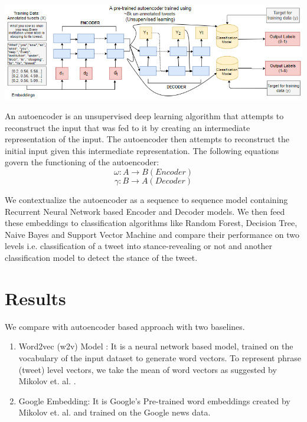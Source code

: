 \documentclass[a0,portrait]{a0poster}
\begin{document}
\begin{multicols}{2}
\begin{center}\vspace{1cm}
\includegraphics[width=0.8\linewidth]{autoencoder.png}
\end{center}\vspace{1cm}

An autoencoder is an unsupervised deep learning algorithm that attempts to reconstruct the input that was fed to it by creating an intermediate representation of the input. The autoencoder then attempts to reconstruct the initial input given this intermediate representation. The following equations govern the functioning of the autoencoder:
\begin{equation}
     \omega: A \to B (Encoder)
 \end{equation}
 \begin{equation}
     \gamma: B \to A (Decoder)
 \end{equation}

We contextualize the autoencoder as a sequence to sequence model containing Recurrent Neural Network based Encoder and Decoder models. We then feed these embeddings to classification algorithms like Random Forest, Decision Tree, Naive Bayes and Support Vector Machine and compare their performance on two levels i.e. classification of a tweet into stance-revealing or not and another classification model to detect the stance of the tweet.

\section*{Results}

We compare with autoencoder based approach with two baselines.
\begin{enumerate}
    \item Word2vec (w2v) Model \cite{mikolov2013efficient}: It is a neural network based model, trained on the vocabulary of the input dataset to generate word vectors. To represent phrase (tweet) level vectors, we take the mean of word vectors as suggested by Mikolov et. al. \cite{mikolov2013distributed}. 
    \item Google Embedding: It is Google's Pre-trained word embeddings created by Mikolov et. al. \cite{mikolov2013distributed} and trained on the Google news data. 
\end{enumerate}


\end{multicols}
\end{document}

